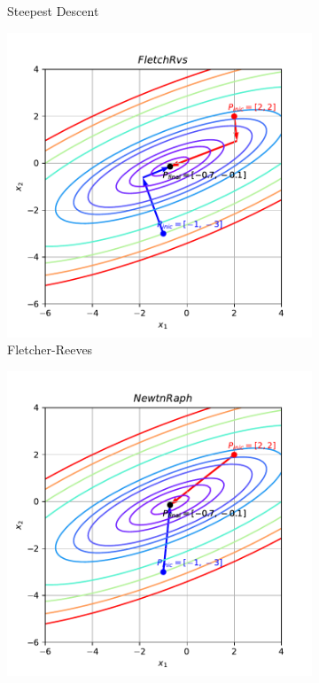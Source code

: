 \documentclass[10pt, a4paper]{article}
\begin{document}
\begin{figure}[htpb]
\begin{subfigure}[b]{0.32\textwidth}
    \caption{Steepest Descent}
    \label{fig:q1a_steepest}
  \end{subfigure}
  \hfill
  \begin{subfigure}[b]{0.32\textwidth}
    \centering
    \includegraphics[width=\textwidth]{images/q1a_FletchRvs.pdf}
    \caption{Fletcher-Reeves}
    \label{fig:q1a_fletchrvs}
  \end{subfigure}
  \hfill
  \begin{subfigure}[b]{0.32\textwidth}
    \centering
    \includegraphics[width=\textwidth]{images/q1a_NewtnRaph.pdf}

\end{subfigure}
\end{figure}
\end{document}
